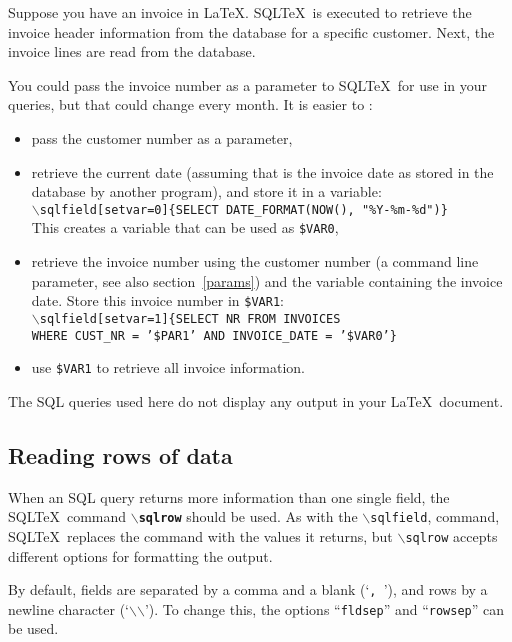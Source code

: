 \documentclass{article}
\newcommand{\bs}{\ensuremath{\backslash}}
\newcommand{\vs}{\vspace{3mm}}
\begin{document}
\vs

Suppose you have an invoice in \LaTeX. SQL\TeX\ is executed to retrieve the invoice header information
from the database for a specific customer. Next, the invoice lines are read from the database.

You could pass the invoice number as a parameter to SQL\TeX\ for use in your queries, but that could
change every month. It is easier to :\\
\begin{itemize}
\item pass the customer number as a parameter,
\item retrieve the current date (assuming that is the invoice date as stored in
the database by another program), and store it in a variable: \\
\texttt{\bs sqlfield[setvar=0]\{SELECT DATE\_FORMAT(NOW(), "\%Y-\%m-\%d")\}} \\
This creates a variable that can be used as \texttt{\$VAR0},
\item retrieve the invoice number using the customer number (a command line parameter,
see also section~\ref{params}) and the variable containing the invoice date.
Store this invoice number in \texttt{\$VAR1}: \\
\texttt{\bs sqlfield[setvar=1]\{SELECT NR FROM INVOICES \\
WHERE CUST\_NR = '\$PAR1' AND INVOICE\_DATE = '\$VAR0'\}}
\item use \texttt{\$VAR1} to retrieve all invoice information.
\end{itemize}

\vs

The SQL queries used here do not display any output in your \LaTeX\ document.


\subsection{Reading rows of data}\label{sqlrow}

When an SQL query returns more information than one single field, the SQL\TeX\
command \texttt{\textbf{\bs sqlrow}} should be used. As with the \texttt{\bs sqlfield},
command, SQL\TeX\ replaces the command with the values it returns, but \texttt{\bs sqlrow}
accepts different options for formatting the output.

\vs

By default, fields are separated by a comma and a blank (`\texttt{,~}'), and rows by 
a newline character (`\texttt{\bs\bs}'). To change this, the options ``\texttt{fldsep}''
and ``\texttt{rowsep}'' can be used.
\end{document}

